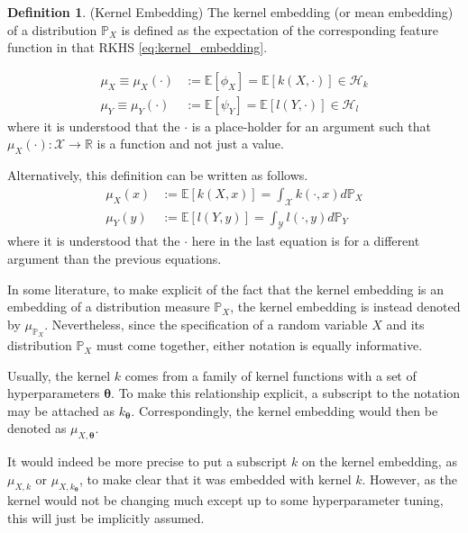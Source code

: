\documentclass[twoside]{article} \usepackage{aistats2017}
\theoremstyle{definition}
\newtheorem{definition}[theorem]{Definition}
\newcommand{\rv}[1]{{#1}}
\newcommand{\expect}[1]{{\mathbb{E}[#1]}}
\newcommand{\Hk}{\mathcal{H}_{k}}
\newcommand{\Hl}{\mathcal{H}_{l}}
\newcommand{\muX}{\mu_{\rv{X}}}
\newcommand{\muY}{\mu_{\rv{Y}}}
\newcommand{\phiX}{\phi_{\rv{X}}}
\newcommand{\psiY}{\psi_{\rv{Y}}}
\begin{document}
		\begin{definition} \label{def:kernel_embedding}
			(Kernel Embedding)
			The kernel embedding (or mean embedding) of a distribution $\mathbb{P}_{\rv{X}}$ is defined as the expectation of the corresponding feature function in that RKHS \eqref{eq:kernel_embedding}.
			
			\begin{equation}
			\begin{aligned}
				\muX \equiv \muX(\cdot) &:= \expect{\phiX} = \expect{k(\rv{X}, \cdot)} \in \Hk \\
				\muY \equiv \muY(\cdot) &:= \expect{\psiY} = \expect{l(\rv{Y}, \cdot)} \in \Hl
			\label{eq:kernel_embedding}
			\end{aligned}
			\end{equation}	
			where it is understood that the $\cdot$ is a place-holder for an argument such that $\muX(\cdot) : \mathcal{X} \to \mathbb{R}$ is a function and not just a value.

			Alternatively, this definition can be written as follows.
			\begin{equation}
			\begin{aligned}
				\muX(x) &:= \expect{k(\rv{X}, x)} = \int_{\mathcal{X}} k(\cdot, x) d \mathbb{P}_{\rv{X}} \\
				\muY(y) &:= \expect{l(\rv{Y}, y)} = \int_{\mathcal{Y}} l(\cdot, y) d \mathbb{P}_{\rv{Y}}
			\label{eq:kernel_embedding_alternative}
			\end{aligned}
			\end{equation}
			where it is understood that the $\cdot$ here in the last equation is for a different argument than the previous equations.

			In some literature, to make explicit of the fact that the kernel embedding is an embedding of a distribution measure $\mathbb{P}_{\rv{X}}$, the kernel embedding is instead denoted by $\mu_{\mathbb{P}_{\rv{X}}}$. Nevertheless, since the specification of a random variable $\rv{X}$ and its distribution $\mathbb{P}_{\rv{X}}$ must come together, either notation is equally informative.

			Usually, the kernel $k$ comes from a family of kernel functions with a set of hyperparameters $\bm{\theta}$. To make this relationship explicit, a subscript to the notation may be attached as $k_{\bm{\theta}}$. Correspondingly, the kernel embedding would then be denoted as $\mu_{\rv{X}, \bm{\theta}}$.

			It would indeed be more precise to put a subscript $k$ on the kernel embedding, as $\mu_{\rv{X}, k}$ or $\mu_{\rv{X}, k_{\bm{\theta}}}$, to make clear that it was embedded with kernel $k$. However, as the kernel would not be changing much except up to some hyperparameter tuning, this will just be implicitly assumed.
		\end{definition}
	
\end{document}
